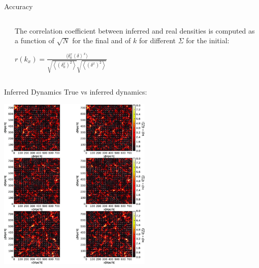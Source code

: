\documentclass[10pt]{beamer}
\begin{document}
\begin{frame}[fragile]{Accuracy}
\begin{columns}
\begin{column}{0.5\textwidth}
        \end{column}
        \begin{column}{0.6\textwidth} %
The correlation coefficient between inferred and real densities is computed as a function of $\sqrt{N}$ for the final and of $k$ for different $\Sigma$ for the initial:
        \begin{center}
        \begingroup\makeatletter{}\check@mathfonts
$r(k_x)=\frac{\langle\delta_0^x\left\langle\delta\right\rangle^x\rangle}{\sqrt{\left\langle(\delta_0^x)^2\right\rangle}\sqrt{\left\langle(\delta^x)^2\right\rangle}}$
\endgroup
        \end{center}
        \end{column}
    \end{columns}

\end{frame}
\begin{frame}[fragile]{Inferred Dynamics}
True vs inferred dynamics:
\begin{center}
    \includegraphics[width=0.55\textwidth]{stt449fig10.jpeg}
\end{center}

  
\end{frame}
\end{document}
